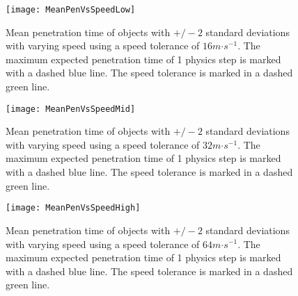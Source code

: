 \begin{figure}[t]
	\centering
	\texttt{[image: MeanPenVsSpeedLow]}
	\caption{Mean penetration time of objects with $+/-2$ standard deviations with varying speed using a speed tolerance of $16m\mathord{\cdot}s^{-1}$. The maximum expected penetration time of 1 physics step is marked with a dashed blue line. The speed tolerance is marked in a dashed green line.}
	\label{fig_CollisionsPenVsSpeedLow}
\end{figure}
\begin{figure}[t]
	\centering
	\texttt{[image: MeanPenVsSpeedMid]}
	\caption{Mean penetration time of objects with $+/-2$ standard deviations with varying speed using a speed tolerance of $32m\mathord{\cdot}s^{-1}$. The maximum expected penetration time of 1 physics step is marked with a dashed blue line. The speed tolerance is marked in a dashed green line.}
	\label{fig_CollisionsPenVsSpeedMid}
\end{figure}
\begin{figure}[t]
	\centering
	\texttt{[image: MeanPenVsSpeedHigh]}
	\caption{Mean penetration time of objects with $+/-2$ standard deviations with varying speed using a speed tolerance of $64m\mathord{\cdot}s^{-1}$. The maximum expected penetration time of 1 physics step is marked with a dashed blue line. The speed tolerance is marked in a dashed green line.}
	\label{fig_CollisionsPenVsSpeedHigh}
\end{figure}
%
%

